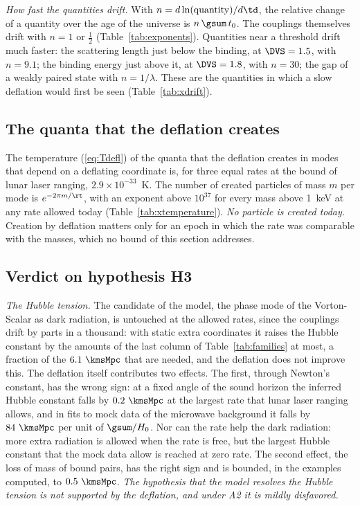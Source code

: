 \emph{How fast the quantities drift.} With $n=d\ln(\text{quantity})/d\td$, the relative change of a
quantity over the age of the universe is $n\,\gsum\,t_0$. The couplings themselves drift with $n=1$
or $\tfrac12$ (Table~\ref{tab:exponents}). Quantities near a threshold drift much faster: the
scattering length just below the binding, at $\DVS=1.5$, with $n=9.1$; the binding energy just above
it, at $\DVS=1.8$, with $n=30$; the gap of a weakly paired state with $n=1/\lambda$. These are the
quantities in which a slow deflation would first be seen (Table~\ref{tab:xdrift}).

\subsection{The quanta that the deflation creates}

The temperature (\ref{eq:Tdefl}) of the quanta that the deflation creates in modes that depend on a
deflating coordinate is, for three equal rates at the bound of lunar laser ranging,
$2.9\times10^{-33}$~K. The number of created particles of mass $m$ per mode is $e^{-2\pi m/\rt}$, with an
exponent above $10^{37}$ for every mass above 1~keV at any rate allowed today
(Table~\ref{tab:xtemperature}). \emph{No particle is
created today.} Creation by deflation matters only for an epoch in which the rate was comparable
with the masses, which no bound of this section addresses.

\subsection{Verdict on hypothesis H3}

\emph{The Hubble tension.} The candidate of the model, the phase mode of the Vorton-Scalar as dark
radiation, is untouched at the allowed rates, since the couplings drift by parts in a thousand: with
static extra coordinates it raises the Hubble constant by the amounts of the last column of
Table~\ref{tab:families} at most, a fraction of the $6.1~\kmsMpc$ that are needed, and the deflation
does not improve this. The deflation itself contributes two effects. The
first, through Newton's constant, has the wrong sign: at a fixed angle of the sound horizon the
inferred Hubble constant falls by $0.2~\kmsMpc$ at the largest rate that lunar laser ranging allows,
and in fits to mock data of the microwave background it falls by $84~\kmsMpc$ per unit of
$\gsum/H_0$. Nor can the rate help the dark radiation: more extra radiation is allowed when the rate
is free, but the largest Hubble constant that the mock data allow is reached at zero rate. The
second effect, the loss of mass of bound pairs, has the right sign and is bounded, in the examples
computed, to $0.5~\kmsMpc$. \emph{The hypothesis that the model resolves the Hubble tension is not
supported by the deflation, and under A2 it is mildly disfavored.}


